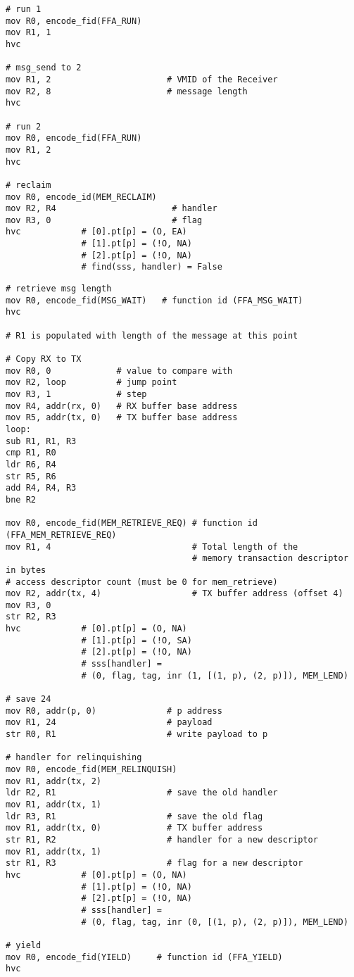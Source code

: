 \documentclass{article}
\begin{document}
\begin{lstlisting}[caption={VM 0}]
# run 1
mov R0, encode_fid(FFA_RUN)
mov R1, 1
hvc

# msg_send to 2
mov R1, 2                       # VMID of the Receiver
mov R2, 8                       # message length
hvc

# run 2
mov R0, encode_fid(FFA_RUN)
mov R1, 2
hvc

# reclaim
mov R0, encode_id(MEM_RECLAIM)
mov R2, R4                       # handler
mov R3, 0                        # flag
hvc            # [0].pt[p] = (O, EA)
               # [1].pt[p] = (!O, NA)
               # [2].pt[p] = (!O, NA)
               # find(sss, handler) = False       
\end{lstlisting}

\begin{lstlisting}[caption={VM 1}]
# retrieve msg length
mov R0, encode_fid(MSG_WAIT)   # function id (FFA_MSG_WAIT)
hvc

# R1 is populated with length of the message at this point

# Copy RX to TX
mov R0, 0             # value to compare with
mov R2, loop          # jump point
mov R3, 1             # step
mov R4, addr(rx, 0)   # RX buffer base address
mov R5, addr(tx, 0)   # TX buffer base address
loop:
sub R1, R1, R3
cmp R1, R0
ldr R6, R4
str R5, R6
add R4, R4, R3
bne R2

mov R0, encode_fid(MEM_RETRIEVE_REQ) # function id (FFA_MEM_RETRIEVE_REQ)
mov R1, 4                            # Total length of the  
                                     # memory transaction descriptor in bytes
# access descriptor count (must be 0 for mem_retrieve)
mov R2, addr(tx, 4)                  # TX buffer address (offset 4)
mov R3, 0
str R2, R3                                    
hvc            # [0].pt[p] = (O, NA)
               # [1].pt[p] = (!O, SA)
               # [2].pt[p] = (!O, NA)
               # sss[handler] = 
               # (0, flag, tag, inr (1, [(1, p), (2, p)]), MEM_LEND)

# save 24
mov R0, addr(p, 0)              # p address
mov R1, 24                      # payload
str R0, R1                      # write payload to p

# handler for relinquishing
mov R0, encode_fid(MEM_RELINQUISH)
mov R1, addr(tx, 2)
ldr R2, R1                      # save the old handler
mov R1, addr(tx, 1)
ldr R3, R1                      # save the old flag
mov R1, addr(tx, 0)             # TX buffer address
str R1, R2                      # handler for a new descriptor
mov R1, addr(tx, 1)
str R1, R3                      # flag for a new descriptor
hvc            # [0].pt[p] = (O, NA)
               # [1].pt[p] = (!O, NA)
               # [2].pt[p] = (!O, NA)
               # sss[handler] = 
               # (0, flag, tag, inr (0, [(1, p), (2, p)]), MEM_LEND)

# yield
mov R0, encode_fid(YIELD)     # function id (FFA_YIELD)
hvc
\end{lstlisting}
\end{document}
